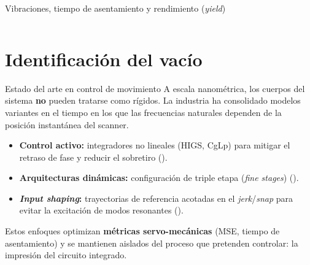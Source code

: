 \documentclass[en,16:9,navbarinline,bigfoot]{sdqbeamer}
\begin{document}
\begin{frame}{Vibraciones, tiempo de asentamiento y rendimiento (\textit{yield})}
\begin{columns}
    \end{columns}
\end{frame}

\section{Identificación del vacío}

\begin{frame}{Estado del arte en control de movimiento}
    A escala nanométrica, los cuerpos del sistema \textbf{no} pueden tratarse como rígidos. La industria ha consolidado modelos variantes en el tiempo en los que las frecuencias naturales dependen de la posición instantánea del scanner.
    \vspace{0.2cm}
    \begin{itemize}
        \item \textbf{Control activo:} integradores no lineales (HIGS, CgLp) para mitigar el retraso de fase y reducir el sobretiro (\cite{Heertjes2025_NonlinearControl}).
        \item \textbf{Arquitecturas dinámicas:} configuración de triple etapa (\textit{fine stages}) (\cite{Al-Rawashdeh2022_Caracterization}).
        \item \textbf{\textit{Input shaping}:} trayectorias de referencia acotadas en el \textit{jerk}/\textit{snap} para evitar la excitación de modos resonantes (\cite{Al-Rawashdeh2023_Trajectories,Lambrechts2003_Trajectories}).
    \end{itemize}
    \vspace{0.2cm}
    Estos enfoques optimizan \textbf{métricas servo-mecánicas} (MSE, tiempo de asentamiento) y se mantienen aislados del proceso que pretenden controlar: la impresión del circuito integrado.
\end{frame}
\end{document}
